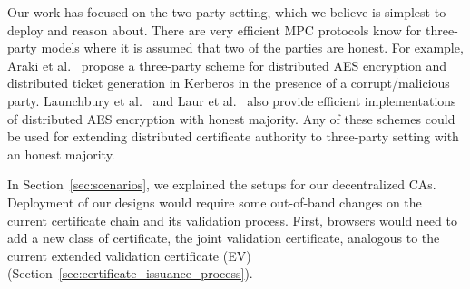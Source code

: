 


 Our work has focused on the two-party setting, which we believe is simplest to deploy and reason about. There are very efficient MPC protocols know for three-party models where it is assumed that two of the parties are honest. For example, Araki et al.~\cite{araki2016high} propose a three-party scheme for distributed AES encryption and distributed ticket generation in Kerberos in the presence of a corrupt/malicious party. Launchbury et al.~\cite{launchbury2012efficient} and Laur et al.~\cite{laur2013oblivious} also provide efficient implementations of distributed AES encryption with honest majority. Any of these schemes could be used for extending distributed certificate authority to three-party setting with an honest majority.


In Section~\ref{sec:scenarios}, we explained the setups for our decentralized CAs. Deployment of our designs would require some out-of-band changes on the current certificate chain and its validation process. First, browsers would need to add a new class of certificate, the joint validation certificate, %
analogous to the current extended validation certificate (EV) (Section~\ref{sec:certificate_issuance_process}). 

